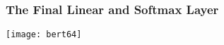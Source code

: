 \begin{frame}[fragile]\frametitle{The Final Linear and Softmax Layer}


			\begin{center}
			\texttt{[image: bert64]}
			\end{center}		

			
\end{frame}




			


			
